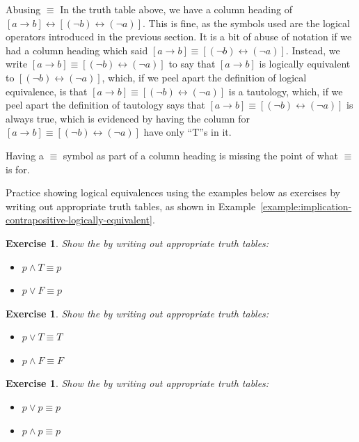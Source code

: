 \documentclass{book}
\newcounter{ekcounter}%
\theoremstyle{ekimcustom}
\newtheorem{exercise}[ekcounter]{Exercise}
\newcommand\defn[1]{{\color{blue}{\bf #1}}}
\begin{document}
\begin{bwarning}{Abusing $\equiv$}{}
In the truth table above, we have a column heading of $[a \rightarrow b] \leftrightarrow [(\neg b) \leftrightarrow (\neg a)]$. This is fine, as the symbols used are the logical operators introduced in the previous section. It is a bit of abuse of notation if we had a column heading which said $[a \rightarrow b] \equiv [(\neg b) \leftrightarrow (\neg a)]$. Instead, we write $[a \rightarrow b] \equiv [(\neg b) \leftrightarrow (\neg a)]$ to say that $[a \rightarrow b]$ is logically equivalent to $[(\neg b) \leftrightarrow (\neg a)]$, which, if we peel apart the definition of logical equivalence, is that $[a \rightarrow b] \equiv [(\neg b) \leftrightarrow (\neg a)]$ is a tautology, which, if we peel apart the definition of tautology says that $[a \rightarrow b] \equiv [(\neg b) \leftrightarrow (\neg a)]$ is always true, which is evidenced by having the column for $[a \rightarrow b] \equiv [(\neg b) \leftrightarrow (\neg a)]$ have only ``T''s in it.

Having a $\equiv$ symbol as part of a column heading is missing the point of what $\equiv$ is for.
\end{bwarning}
Practice showing logical equivalences using the examples below as exercises by writing out appropriate truth tables, as shown in Example~\ref{example:implication-contrapositive-logically-equivalent}.
\begin{exercise}
Show the \defn{identity laws} by writing out appropriate truth tables:
\begin{itemize}
\item $p \wedge T \equiv p$
\item $p \vee F \equiv p$
\end{itemize}
\end{exercise}

\begin{exercise}
Show the \defn{domination laws} by writing out appropriate truth tables:
\begin{itemize}
\item $p \vee T \equiv T$
\item $p \wedge F \equiv F$
\end{itemize}
\end{exercise}

\begin{exercise}
Show the \defn{repetition removal laws} by writing out appropriate truth tables:
\begin{itemize}
\item $p \vee p\equiv p$
\item $p \wedge p\equiv p$
\end{itemize}
\end{exercise}
\end{document}
